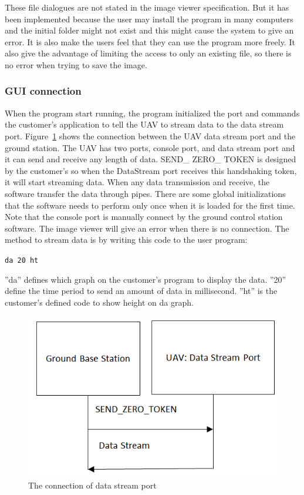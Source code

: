 These file dialogues are not stated in the image viewer specification. But it has been implemented because the user may install the program in many computers and the initial folder might not exist and this might cause the system to give an error. It is also make the users feel that they can use the program more freely.  It also give the advantage of limiting the access to only an existing file, so there is no error when trying to save the image.

\subsubsection*{GUI connection}
 When the program start running, the program initialized the port and commands the customer’s application to tell the UAV to stream data to the data stream port. Figure~\ref{GCS_connect_command} shows the connection between the UAV data stream port and the ground station. The UAV has two ports, console port, and data stream port and it can send and receive any length of data. SEND\_ ZERO\_ TOKEN is designed by the customer’s so when the DataStream port receives this handshaking token, it will start streaming data. When any data transmission and receive, the software transfer the data through pipes. There are some global initializations that the software needs to perform only once when it is loaded for the first time. Note that the console port is manually connect by the ground control station software. The image viewer will give an error when there is no connection.
 The method to stream data is by writing this code to the user program:
 
\begin{center}
\texttt{da 20 ht}
\end{center}

''da'' defines which graph on the customer's program to display the data. ''20'' define the time period to send an amount of data in millisecond. ''ht'' is the customer's defined code to show height on da graph. 



\begin{figure}[!hbtp]
\begin{center}
\includegraphics[scale=0.5]{connect_command.png} 
\end{center}
\caption{The connection of data stream port\label{GCS_connect_command}}
\end{figure}


